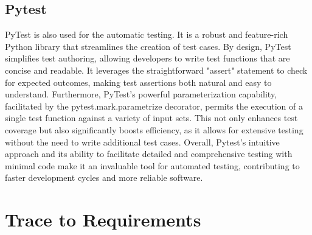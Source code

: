 \documentclass[12pt, titlepage]{article}
\begin{document}
\subsection{Pytest}
PyTest is also used for the automatic testing. It is a robust and feature-rich
Python library that streamlines the creation of test cases. By design, PyTest
simplifies test authoring, allowing developers to write test functions that are
concise and readable. It leverages the straightforward "assert" statement to
check for expected outcomes, making test assertions both natural and easy to
understand. Furthermore, PyTest's powerful parameterization capability,
facilitated by the pytest.mark.parametrize decorator, permits the execution of a
single test function against a variety of input sets. This not only enhances
test coverage but also significantly boosts efficiency, as it allows for
extensive testing without the need to write additional test cases. Overall,
Pytest's intuitive approach and its ability to facilitate detailed and
comprehensive testing with minimal code make it an invaluable tool for automated
testing, contributing to faster development cycles and more reliable software.

\section{Trace to Requirements}
\end{document}
